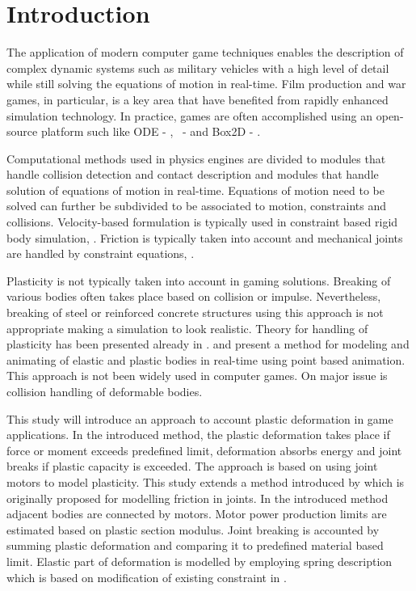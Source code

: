 \section{Introduction}

The application of modern computer game techniques enables the description of complex dynamic systems 
such as military vehicles with a high level of detail while still solving the equations of motion in real-time.
Film production and war games, in particular, is a key area that have benefited from rapidly enhanced simulation technology. 
In practice, games are often accomplished using an open-source platform such 
like ODE - \cite{ode}, \bullet\ - \cite{bullet} and Box2D - \cite{box2d}.

Computational methods used in physics engines are divided to modules that handle collision detection and 
contact description and modules that handle solution of equations of motion in real-time. Equations of motion need to be 
solved can further be subdivided to be associated to motion, constraints and collisions. 
Velocity-based formulation is typically used in constraint based rigid body simulation, \cite{erleben.thesis}. 
Friction is typically taken into account and mechanical joints are handled by constraint equations,
\cite{erleben.thesis}.

Plasticity is not typically taken into account in gaming solutions. 
Breaking of various bodies often takes place based on collision or impulse.
Nevertheless, breaking of steel or reinforced concrete structures using this approach 
is not appropriate making a simulation to look realistic. Theory for handling of plasticity 
has been presented already in \cite{cg1988}. \cite{muller2004point} and \cite{muller2005meshless} 
present a method for modeling and animating of elastic and plastic bodies in real-time using 
point based animation. This approach is not been widely used in computer games.  
On major issue is collision handling of deformable bodies.

This study will introduce an approach to account plastic deformation in game applications.   
In the introduced method, the plastic deformation takes place if force or moment exceeds predefined 
limit, deformation absorbs energy and joint breaks if plastic capacity is exceeded. 
The approach is based on using joint motors to model plasticity. 
This study extends a method introduced by
\citet{erleben.thesis} 
which is originally proposed for modelling friction in joints. 
In the introduced method adjacent bodies are connected by motors. 
Motor power production limits are estimated based on plastic section modulus. 
Joint breaking is accounted by summing plastic deformation and comparing it to 
predefined material based limit. Elastic part of deformation is modelled by employing 
spring description which is based on modification of existing constraint in \bullet.


